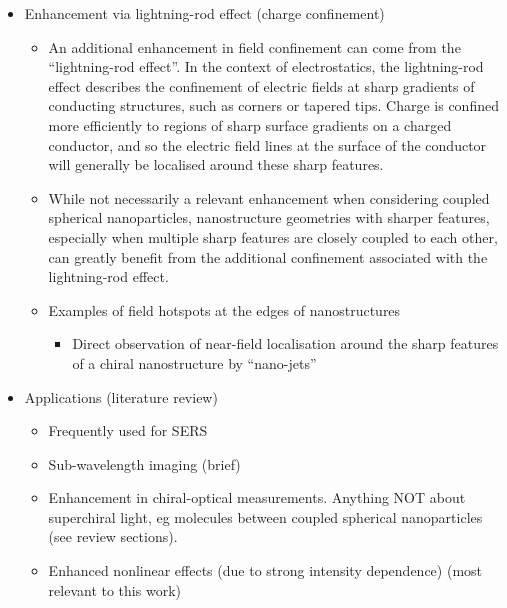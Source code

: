 \begin{itemize}
\begin{itemize}
        \end{itemize}
    \item Enhancement via lightning-rod effect (charge confinement)
    \begin{itemize}
        \item An additional enhancement in field confinement can come from the ``lightning-rod effect''. In the context of electrostatics, the lightning-rod effect describes the confinement of electric fields at sharp gradients of conducting structures, such as corners or tapered tips. Charge is confined more efficiently to regions of sharp surface gradients on a charged conductor, and so the electric field lines at the surface of the conductor will generally be localised around these sharp features.
        \item While not necessarily a relevant enhancement when considering coupled spherical nanoparticles, nanostructure geometries with sharper features, especially when multiple sharp features are closely coupled to each other, can greatly benefit from the additional confinement associated with the lightning-rod effect.
        \item Examples of field hotspots at the edges of nanostructures
        \begin{itemize}
            \item Direct observation of near-field localisation around the sharp features of a chiral nanostructure by ``nano-jets''~\cite{Valev2012d}
        \end{itemize}
    \end{itemize}
    
    \item Applications (literature review)
    \begin{itemize}
        \item Frequently used for SERS
        \item Sub-wavelength imaging (brief)
        \item Enhancement in chiral-optical measurements. Anything NOT about superchiral light, eg molecules between coupled spherical nanoparticles (see review sections).
        \item Enhanced nonlinear effects (due to strong intensity dependence) (most relevant to this work)
    \end{itemize}
\end{itemize}

